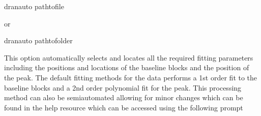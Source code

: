 \documentclass[letterpaper,10pt,english]{sphinxmanual}
\begin{document}
\begin{sphinxVerbatim}[commandchars=\\\{\}]
\PYGZdl{} dran\PYGZhy{}auto path\PYGZus{}to\PYGZus{}file

or

\PYGZdl{} dran\PYGZhy{}auto path\PYGZus{}to\PYGZus{}folder
\end{sphinxVerbatim}

\sphinxAtStartPar
This option automatically selects and locates all the required fitting
parameters including the positions and locations of the baseline blocks
and the position of the peak. The default fitting methods for the data
performs a 1st order fit to the baseline blocks and a 2nd order polynomial
fit for the peak. This processing method can also be semi\sphinxhyphen{}automated allowing for
minor changes which can be found in the help resource which can be accessed using the
following prompt
\end{document}
